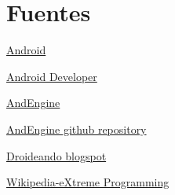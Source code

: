 \documentclass[12 pt, a4paper, twoside]{article}
\begin{document}
\section{Fuentes}
\href{http://www.android.com}{Android}

\href{http://developer.android.com/index.html}{Android Developer}

\href{http://www.andengine.org/}{AndEngine}

\href{https://github.com/nicolasgramlich/AndEngine}{AndEngine github repository}

\href{http://droideando.blogspot.com.es}{Droideando blogspot}

\href{http://en.wikipedia.org/wiki/Extreme_programming}{Wikipedia-eXtreme
Programming}
\end{document}
